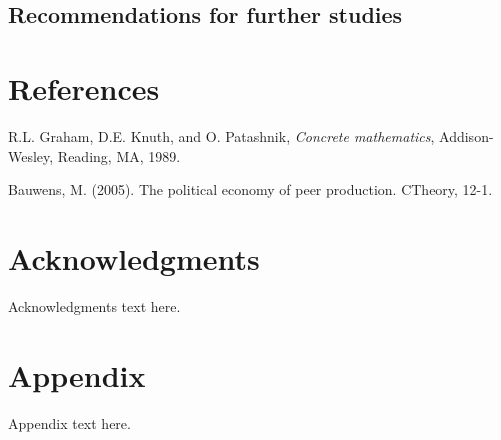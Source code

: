 \documentclass{ICED-Paper}%
\begin{document}
\subsection{Recommendations for further studies}

\section*{References}

\begin{thebibliography}



  R.L. Graham, D.E. Knuth, and O. Patashnik, \emph{Concrete
  mathematics}, Addison-Wesley, Reading, MA, 1989.

  Bauwens, M. (2005). The political economy of peer production. CTheory, 12-1.

\end{thebibliography}

\section*{Acknowledgments}

Acknowledgments text here.

\appendix

\section*{Appendix}

Appendix text here.
\end{document}
